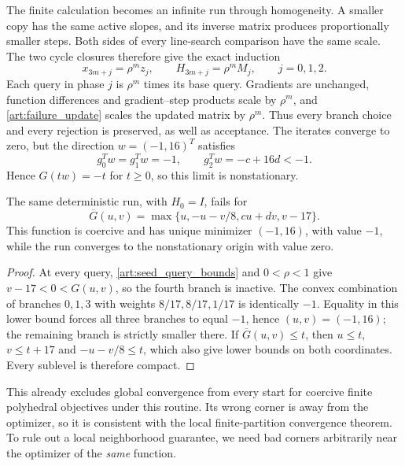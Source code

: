 The finite calculation becomes an infinite run through homogeneity. A smaller
copy has the same active slopes, and its inverse matrix produces proportionally
smaller steps. Both sides of every line-search comparison have the same scale.
The two cycle closures therefore give the exact induction
\begin{equation}\label{art:cone_orbit}
 x_{3m+j}=\rho^mz_j,\qquad H_{3m+j}=\rho^mM_j,\qquad j=0,1,2.
\end{equation}
Each query in phase $j$ is $\rho^m$ times its base query. Gradients are
unchanged, function differences and gradient--step products scale by
$\rho^m$, and \eqref{art:failure_update} scales the updated matrix by
$\rho^m$. Thus every branch choice and every rejection is preserved, as
well as acceptance. The iterates converge to zero, but the direction
$w=(-1,16)^T$ satisfies
\[
 g_0^Tw=g_1^Tw=-1,\qquad g_2^Tw=-c+16d<-1.
\]
Hence $G(tw)=-t$ for $t\ge0$, so this limit is nonstationary.

\begin{corollary}\label{art:failure_polyhedral}
The same deterministic run, with $H_0=I$, fails for
\[
 \overline G(u,v)=\max\{u,-u-v/8,cu+dv,v-17\}.
\]
This function is coercive and has unique minimizer $(-1,16)$, with value
$-1$, while the run converges to the nonstationary origin with value zero.
\end{corollary}
\begin{proof}
At every query, \eqref{art:seed_query_bounds} and $0<\rho<1$ give
$v-17<0<G(u,v)$, so the fourth branch is inactive. The convex combination
of branches $0,1,3$ with weights $8/17,8/17,1/17$ is identically $-1$.
Equality in this lower bound forces all three branches to equal $-1$,
hence $(u,v)=(-1,16)$; the remaining branch is strictly smaller there.
If $\overline G(u,v)\le t$, then
$u\le t$, $v\le t+17$ and $-u-v/8\le t$, which also give lower bounds
on both coordinates. Every sublevel is therefore compact.
\end{proof}
This already excludes global convergence from every start for coercive finite
polyhedral objectives under this routine. Its wrong corner is away from the
optimizer, so it is consistent with the local finite-partition convergence
theorem. To rule out a local neighborhood guarantee, we need bad corners
arbitrarily near the optimizer of the \emph{same} function.

